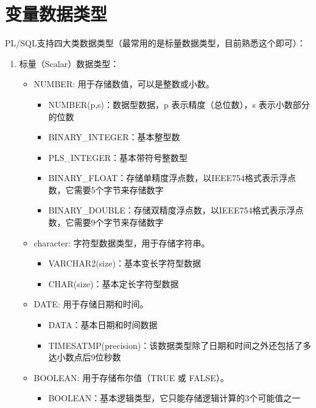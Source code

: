\documentclass[11pt, a4paper, oneside, UTF8]{ctexbook}
\begin{document}
\section{变量数据类型}
PL/SQL支持四大类数据类型（最常用的是标量数据类型，目前熟悉这个即可）：
\begin{enumerate}
  \item 标量（Scalar）数据类型：
        \begin{itemize}
          \item NUMBER: 用于存储数值，可以是整数或小数。
                \begin{itemize}
                  \item NUMBER(p,s)：数据型数据，p 表示精度（总位数），s 表示小数部分的位数
                  \item BINARY\_INTEGER：基本整型数
                  \item PLS\_INTEGER：基本带符号整数型
                  \item BINARY\_FLOAT：存储单精度浮点数，以IEEE754格式表示浮点数，它需要5个字节来存储数字
                  \item BINARY\_DOUBLE：存储双精度浮点数，以IEEE754格式表示浮点数，它需要9个字节来存储数字
                \end{itemize}
          \item character: 字符型数据类型，用于存储字符串。
                \begin{itemize}
                  \item VARCHAR2(size)：基本变长字符型数据
                  \item CHAR(size)：基本定长字符型数据
                \end{itemize}
          \item DATE: 用于存储日期和时间。
                \begin{itemize}
                  \item DATA：基本日期和时间数据
                  \item TIMESATMP(precision)：该数据类型除了日期和时间之外还包括了多达小数点后9位秒数
                \end{itemize}
          \item BOOLEAN: 用于存储布尔值（TRUE 或 FALSE）。
                \begin{itemize}
                  \item BOOLEAN：基本逻辑类型，它只能存储逻辑计算的3个可能值之一
                \end{itemize}
        \end{itemize}

\end{enumerate}
\end{document}
